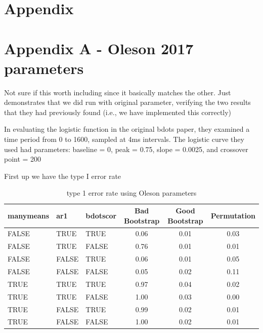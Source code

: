 \documentclass{article}
\begin{document}


\section*{Appendix}

\section*{Appendix A - Oleson 2017 parameters}

Not sure if this worth including since it basically matches the other. Just demonstrates that we did run with original parameter, verifying the two results that they had previously found (i.e., we have implemented this correctly)

In evaluating the logistic function in the original bdots paper, they examined a time period from 0 to 1600, sampled at 4ms intervals. The logistic curve they used had parameters: baseline = 0, peak = 0.75, slope = 0.0025, and crossover point = 200

First up we have the type I error rate

\begin{table}[H]
\centering
\begin{tabular}{lllccc}
  \hline
  manymeans & ar1 & bdotscor &  Bad Bootstrap & Good Bootstrap & Permutation  \\ 
  \hline
FALSE & TRUE & TRUE & 0.06 & 0.01 & 0.03 \\ 
  FALSE & TRUE & FALSE & 0.76 & 0.01 & 0.01 \\ 
  FALSE & FALSE & TRUE & 0.06 & 0.01 & 0.05 \\ 
  FALSE & FALSE & FALSE & 0.05 & 0.02 & 0.11 \\ 
  TRUE & TRUE & TRUE & 0.97 & 0.04 & 0.02 \\ 
  TRUE & TRUE & FALSE & 1.00 & 0.03 & 0.00 \\ 
  TRUE & FALSE & TRUE & 0.99 & 0.02 & 0.01 \\ 
  TRUE & FALSE & FALSE & 1.00 & 0.02 & 0.01 \\ 
   \hline
\end{tabular}
\caption{type 1 error rate using Oleson parameters}
\end{table}
\end{document}
